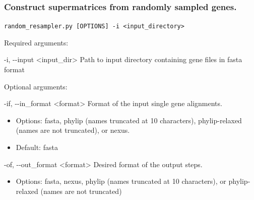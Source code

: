 \documentclass{article}
\def\code#1{\texttt{#1}}
\begin{document}
        \subsubsection{Construct supermatrices from randomly sampled genes.}
        \begin{description}
        
            \vspace{0.2cm}
            \item \code{random\_resampler.py [OPTIONS] -i <input\_directory>}
            \vspace{0.2cm}
            
            \begin{description}
                \item Required arguments:
                \begin{description}
                    \item   -i, -\/-input \hspace{0.2cm} <input\_dir> \hspace{0.2cm} Path to input directory containing gene files in fasta format
                \end{description}
            \end{description}
            \vspace{0.2cm}
            \begin{description}
                \item Optional arguments:
                \begin{description}
                    \item -if, -\/-in\_format \hspace{0.2cm} <format> \hspace{0.2cm} Format of the input single gene alignments.
                    \begin{itemize}
                        \item Options: fasta, phylip (names truncated at 10 characters), phylip-relaxed (names are not truncated), or nexus.
                        \item Default: fasta
                    \end{itemize}
                    \item -of, -\/-out\_format \hspace{0.2cm} <format> \hspace{0.2cm}	Desired format of the output steps.
                    \begin{itemize}
                        \item Options: fasta, nexus, phylip (names truncated at 10 characters), or phylip-relaxed (names are not truncated)

\end{itemize}
\end{description}
\end{description}
\end{description}
\end{document}
